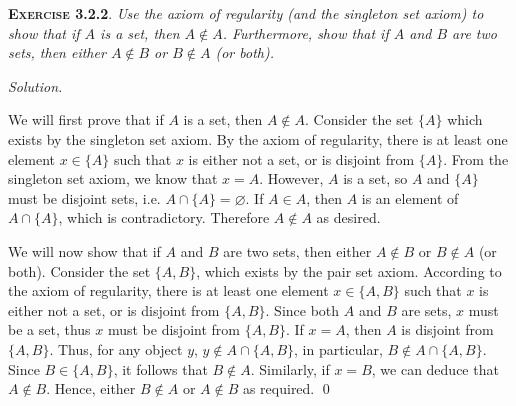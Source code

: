 \documentclass[12pt]{article}
\theoremstyle{remark}
\newenvironment{exer}[2]{
    \noindent \setlength{\parskip}{1em}%
    \textsc{\textbf{Exercise #1}}. \textit{#2} \par
    \noindent \textit{Solution.} %
}{\bigskip}
\begin{document}
\begin{exer}{3.2.2}{
    Use the axiom of regularity (and the singleton set axiom) to show that if $A$ is a set, then $A \notin A$.
    Furthermore, show that if $A$ and $B$ are two sets, then either $A \notin B$ or $B \notin A$ (or both).
}
    We will first prove that if $A$ is a set, then $A \notin A$.
    Consider the set $\{ A \}$ which exists by the singleton set axiom.
    By the axiom of regularity, there is at least one element $x \in \{ A \}$ such that $x$ is either not a set, or is disjoint from $\{ A \}$.
    From the singleton set axiom, we know that $x = A$.
    However, $A$ is a set, so $A$ and $\{ A \}$ must be disjoint sets, i.e. $A \cap \{ A \} = \varnothing$.
    If $A \in A$, then $A$ is an element of $A \cap \{ A \}$, which is contradictory.
    Therefore $A \notin A$ as desired.
    
    We will now show that if $A$ and $B$ are two sets, then either $A \notin B$ or $B \notin A$ (or both).
    Consider the set $\{ A, B \}$, which exists by the pair set axiom.
    According to the axiom of regularity, there is at least one element $x \in \{  A, B \}$ such that $x$ is either not a set, or is disjoint from $\{ A, B \}$.
    Since both $A$ and $B$ are sets, $x$ must be a set, thus $x$ must be disjoint from $\{ A, B \}$.
    If $x = A$, then $A$ is disjoint from $\{ A, B \}$.
    Thus, for any object $y$, $y \notin A \cap \{ A, B \}$, in particular, $B \notin A \cap \{ A, B \}$.
    Since $B \in \{ A, B \}$, it follows that $B \notin A$.
    Similarly, if $x = B$, we can deduce that $A \notin B$.
    Hence, either $B \notin A$ or $A \notin B$ as required. \qed
\end{exer}
\end{document}
